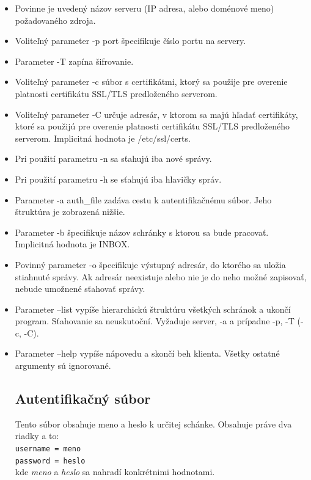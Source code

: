 \documentclass{article}
\begin{document}
\begin{itemize}
\item Povinne je uvedený názov serveru (IP adresa, alebo doménové meno) požadovaného zdroja.
\item    Voliteľný parameter -p port špecifikuje číslo portu na servery.
\item    Parameter -T zapína šifrovanie.
\item    Voliteľný parameter -c súbor s certifikátmi, ktorý sa použije pre overenie platnosti certifikátu SSL/TLS predloženého serverom.
\item    Voliteľný parameter -C určuje adresár, v ktorom sa majú hľadať certifikáty, ktoré sa použijú pre overenie platnosti certifikátu SSL/TLS predloženého serverom. Implicitná hodnota je /etc/ssl/certs.
\item    Pri použití parametru -n sa sťahujú iba nové správy.
\item    Pri použití parametru -h se sťahujú iba hlavičky správ.
\item    Parameter -a auth\_file zadáva cestu k autentifikačnému súbor. Jeho štruktúra je zobrazená nižšie.
\item    Parameter -b špecifikuje názov schránky s ktorou sa bude pracovať. Implicitná hodnota je INBOX.
\item    Povinný parameter -o špecifikuje výstupný adresár, do ktorého sa uložia stiahnuté správy. Ak adresár neexistuje alebo nie je do neho možné zapisovať, nebude umožnené sťahovať správy.
\item   Parameter --list vypíše hierarchickú štruktúru všetkých schránok a ukončí program. Sťahovanie sa
    neuskutoční. Vyžaduje server, -a a prípadne -p, -T (-c, -C).
\item   Parameter --help vypíše nápovedu a skončí beh klienta. Všetky ostatné argumenty sú ignorované.

\subsection{Autentifikačný súbor}
Tento súbor obsahuje meno a heslo k určitej schánke. Obsahuje práve dva riadky a to:\\
\texttt{username = meno\\
password = heslo}\\
kde \textit{meno} a \textit{heslo} sa nahradí konkrétnimi hodnotami.

\end{itemize}
\end{document}
